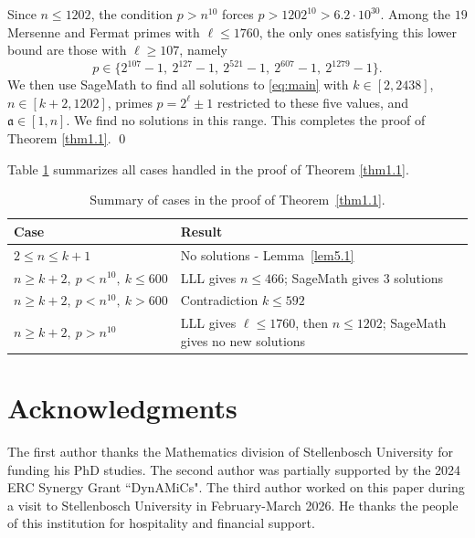 \documentclass[11pt,a4paper]{article}
\numberwithin{equation}{section}
\numberwithin{table}{section}
\numberwithin{figure}{section}
\begin{document}
Since $n \leq 1202$, the condition $p > n^{10}$ forces $p > 1202^{10} > 6.2 \cdot 10^{30}$. Among the $19$ 
Mersenne and Fermat primes with $\ell \leq 1760$, the only ones satisfying this lower bound are those with 
$\ell \geq 107$, namely 
$$p \in \{2^{107}-1,\ 2^{127}-1,\ 2^{521}-1,\ 2^{607}-1,\ 2^{1279}-1\}.$$
We then use SageMath to find all solutions to \eqref{eq:main} with $k \in [2, 2438]$, $n \in [k+2, 1202]$, primes $p = 2^{\ell} \pm 1$ restricted to these five values, and $\mathfrak{a} \in [1, n]$. We find no solutions in this range.
This completes the proof of Theorem \ref{thm1.1}. \qed

Table \ref{tab:cases} summarizes all cases handled in the proof of Theorem \ref{thm1.1}.
\begin{table}[H]
	\centering
	\renewcommand{\arraystretch}{1.5}
	\begin{tabular}{lp{8cm}}
		\hline
		\textbf{Case} & \textbf{Result} \\
		\hline
		$2 \leq n \leq k+1$ & No solutions - Lemma~\ref{lem5.1} \\[4pt]
		$n \geq k+2,\ p < n^{10},\ k \leq 600$ & LLL gives $n \leq 466$; 
		SageMath gives $3$ solutions \\[4pt]
		$n \geq k+2,\ p < n^{10},\ k > 600$ & Contradiction $k \leq 592$ \\[4pt]
		$n \geq k+2,\ p > n^{10}$ & LLL gives $\ell \leq 1760$, then 
		$n \leq 1202$; SageMath gives no new solutions \\
		\hline
	\end{tabular}
	\caption{Summary of cases in the proof of Theorem~\ref{thm1.1}.}
	\label{tab:cases}
\end{table}

\section*{Acknowledgments} 
The first author thanks the Mathematics division of Stellenbosch University for funding his PhD studies. The second author was partially supported by the 2024 ERC Synergy Grant ``DynAMiCs". The third author worked on this paper during a visit to Stellenbosch University in February-March 2026. He thanks the people of this institution for hospitality and financial support. 
\end{document}
